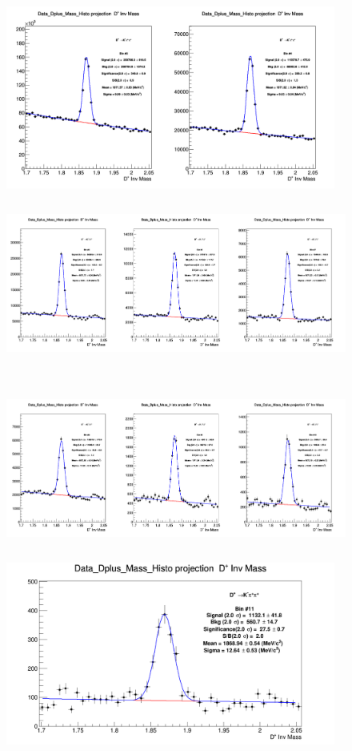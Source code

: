 \begin{enumerate}
\begin{figure}[!htp]
\centering
{\includegraphics[width=1\linewidth, height=6cm]{figures/DplusPlotsweff/InvMassDistributions_Dplus_Bins3to4.png}}
{\includegraphics[width=1\linewidth, height=6cm]{figures/DplusPlotsweff/InvMassDistributions_Dplus_Bins5to7.png}}
{\includegraphics[width=1\linewidth, height=6cm]{figures/DplusPlotsweff/InvMassDistributions_Dplus_Bins8to10.png}}
{\includegraphics[width=1\linewidth, height=6cm]{figures/DplusPlotsweff/InvMassDistributions_Dplus_Bins11to11.png}}


\end{figure}
\end{enumerate}
